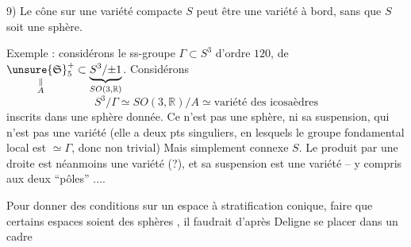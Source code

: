 9) Le cône sur une variété compacte $S$ peut être une variété à bord, sans que $S$ soit une sphère.

Exemple : considérons le ss-groupe $\Gamma\subset S^3$ d'ordre $120$,  de $\underset{\substack{\Vert\\ A}}{\unsure{\mathfrak S}_5^+}\subset\underbrace{S^3/\mathord{\pm}1}_{SO(3,\mathbb R)}$. Considérons
\[
S^3/\Gamma\simeq SO(3,\mathbb R)/A\simeq\text{variété des icosaèdres}
\]
 inscrits dans une sphère donnée. Ce n'est pas une sphère, ni sa suspension, qui n'est pas une variété (elle a deux pts singuliers, en lesquels le groupe fondamental local est $\simeq\Gamma$, donc non trivial) Mais    simplement connexe $S$.   Le produit par une droite est néanmoins une variété (?), et sa suspension est une variété  -- y compris aux deux ``pôles'' ....


Pour donner des conditions   sur un espace à stratification  conique,   faire que certains espaces soient des sphères , il faudrait d'après Deligne se placer dans un cadre

